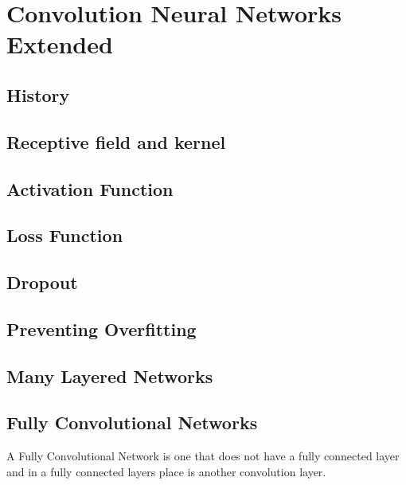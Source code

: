 \section{Convolution Neural Networks Extended}

\subsection*{History}

\subsection*{Receptive field and kernel}

\subsection*{Activation Function}

\subsection*{Loss Function}

\subsection*{Dropout}

\subsection*{Preventing Overfitting}

\subsection*{Many Layered Networks}

\subsection*{Fully Convolutional Networks}
A Fully Convolutional Network is one that does not have a fully connected layer
and in a fully connected layers place is another convolution layer.